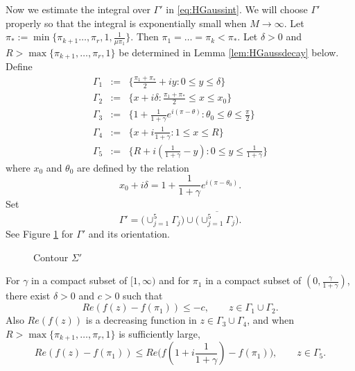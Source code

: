 \documentclass[11pt]{article}
\begin{document}
Now we estimate the integral over $\Gamma'$ in
\eqref{eq:HGaussint}. We will choose $\Gamma'$ properly so that
the integral is exponentially small when $M\to\infty$. Let
$\pi_*:=\min\{ \pi_{k+1}\dots, \pi_r, 1, \frac1{\mu \pi_1}\}$.
Then $\pi_1=\dots=\pi_k<\pi_*$. Let $\delta>0$  and
$R>\max\{\pi_{k+1}, \dots, \pi_r, 1\}$ be determined in Lemma
\ref{lem:HGaussdecay} below. Define
\begin{eqnarray}
  \Gamma_1 &:=& \{ \frac{\pi_1+\pi_*}2+iy: 0\le y\le \delta \} \\
  \Gamma_2 &:=& \{ x+i\delta : \frac{\pi_1+\pi_*}2 \le x\le x_0  \} \\
  \Gamma_3 &:=& \{ 1+ \frac{1}{1+\gamma}e^{i(\pi-\theta)} : \theta_0\le \theta\le
  \frac{\pi}2 \} \\
  \Gamma_4 &:=& \{ x+i\frac1{1+\gamma} : 1 \le x\le R  \} \\
  \Gamma_5 &:=& \{ R+i(\frac1{1+\gamma}-y) : 0\le y\le \frac{1}{1+\gamma}  \}
\end{eqnarray}
where $x_0$ and $\theta_0$ are defined by the relation
\begin{equation}\label{eq:x0theta0}
  x_0+i\delta= 1+ \frac{1}{1+\gamma}e^{i(\pi-\theta_0)}.
\end{equation}
Set
\begin{equation}
  \Gamma'= \bigl(\cup_{j=1}^5 \Gamma_j \bigr) \cup \overline{\bigl(\cup_{j=1}^5 \Gamma_j
  \bigr)}.
\end{equation}
See Figure \ref{fig:Steep4} for $\Gamma'$ and its orientation.
\begin{figure}[ht]
\centerline{\epsfxsize=11cm} \caption{Contour
$\Sigma'$}\label{fig:Steep4}
\end{figure}

\begin{lemma}\label{lem:HGaussdecay}
For $\gamma$ in a compact subset of $[1,\infty)$ and for $\pi_1$
in a compact subset of $(0,\frac{\gamma}{1+\gamma})$, there exist
$\delta>0$ and $c>0$ such that
\begin{equation}
  Re(f(z)-f(\pi_1))\le -c, \qquad z\in \Gamma_1\cup\Gamma_2.
\end{equation}
Also $Re(f(z))$ is a decreasing function in $z\in\Gamma_3
\cup\Gamma_4$, and when $R>\max\{\pi_{k+1},\dots, \pi_r,1\}$ is
sufficiently large,
\begin{equation}
  Re(f(z)-f(\pi_1)) \le Re\biggl(f(1+i\frac1{1+\gamma})-f(\pi_1)\biggr),
  \qquad z\in \Gamma_5.
\end{equation}
\end{lemma}
\end{document}
